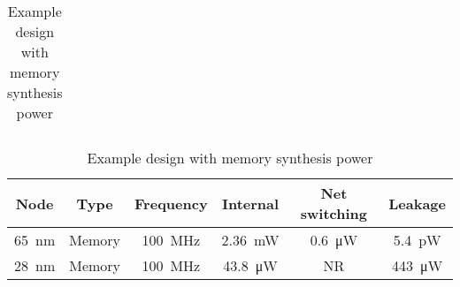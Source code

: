 \begin{table}[h]
\begin{subtable}{0.65\textwidth}
\begin{adjustbox}{width=1\textwidth}
\begin{tabular}{ |c|c|c|c|c|c|  }
              \hline
            \end{tabular}
        \end{adjustbox}
      \caption{Example logic only design synthesis power}
      \label{tab:Scaling}
    \end{subtable}
    \begin{subtable}{0.65\textwidth}
        \vspace{5mm}
        \begin{adjustbox}{width=1\textwidth}
            \footnotesize
            \begin{tabular}{ |c|c|c|c|c|c|  }
              \hline
          Node  & Type      & Frequency                              & Internal                & Net switching           & Leakage                 \\
              \hline
          \SI{65}{\nano\meter}  & Memory    & \SI[per-mode=symbol]{100}{\mega\hertz}  & \SI{2.36}{\milli\watt}  & \SI{0.6}{\micro\watt}  & \SI{5.4}{\pico\watt}    \\   %
          \SI{28}{\nano\meter}  & Memory    & \SI[per-mode=symbol]{100}{\mega\hertz}  & \SI{43.8}{\micro\watt}  & NR                     & \SI{443}{\micro\watt}   \\   %
              \hline
            \end{tabular}
        \end{adjustbox}
      \caption{Example design with memory synthesis power}
      \label{tab:Example design with memory synthesis power}
    \end{subtable}

\end{table}
